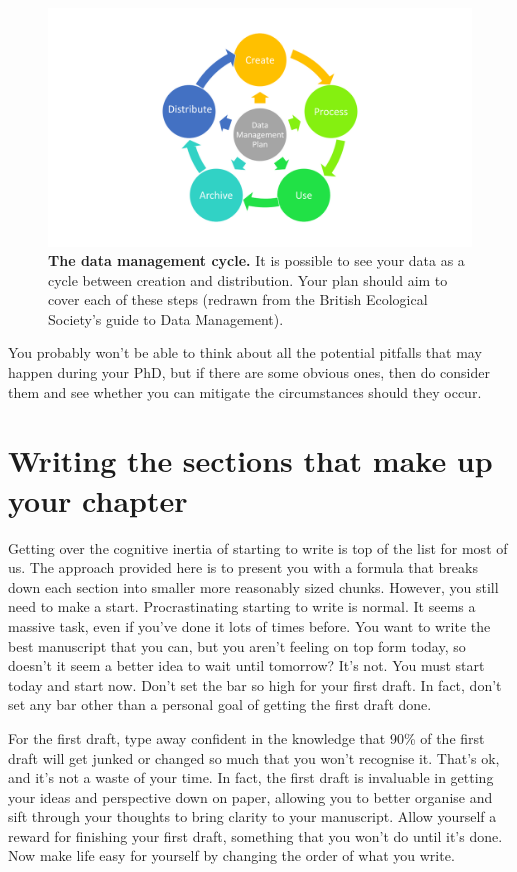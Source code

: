\documentclass[
]{krantz}
\begin{document}
\begin{figure}
\includegraphics[width=0.95\linewidth]{figures/Data-management} \caption{\textbf{The data management cycle.} It is possible to see your data as a cycle between creation and distribution. Your plan should aim to cover each of these steps (redrawn from the British Ecological Society's guide to Data Management).}\label{fig:Data-management}
\end{figure}

You probably won't be able to think about all the potential pitfalls that may happen during your PhD, but if there are some obvious ones, then do consider them and see whether you can mitigate the circumstances should they occur.

\hypertarget{part3}{%
\chapter{Writing the sections that make up your chapter}\label{part3}}

Getting over the cognitive inertia of starting to write is top of the list for most of us. The approach provided here is to present you with a formula that breaks down each section into smaller more reasonably sized chunks. However, you still need to make a start. Procrastinating starting to write is normal. It seems a massive task, even if you've done it lots of times before. You want to write the best manuscript that you can, but you aren't feeling on top form today, so doesn't it seem a better idea to wait until tomorrow? It's not. You must start today and start now. Don't set the bar so high for your first draft. In fact, don't set any bar other than a personal goal of getting the first draft done.

For the first draft, type away confident in the knowledge that 90\% of the first draft will get junked or changed so much that you won't recognise it. That's ok, and it's not a waste of your time. In fact, the first draft is invaluable in getting your ideas and perspective down on paper, allowing you to better organise and sift through your thoughts to bring clarity to your manuscript. Allow yourself a reward for finishing your first draft, something that you won't do until it's done. Now make life easy for yourself by changing the order of what you write.
\end{document}
